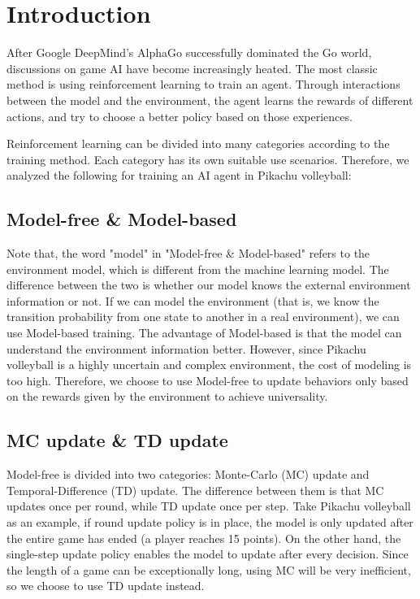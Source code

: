 \documentclass[sigconf]{acmart}
\begin{document}
\section{Introduction}
After Google DeepMind's AlphaGo successfully dominated the Go world, discussions on game AI have become increasingly heated. The most classic method is using reinforcement learning to train an agent. Through interactions between the model and the environment, the agent learns the rewards of different actions, and try to choose a better policy based on those experiences.

Reinforcement learning can be divided into many categories according to the training method. Each category has its own suitable use scenarios. Therefore, we analyzed the following for training an AI agent in Pikachu volleyball:
\subsection{Model-free \& Model-based}
Note that, the word "model" in "Model-free \& Model-based" refers to the environment model, which is different from the machine learning model. The difference between the two is whether our model knows the external environment information or not. If we can model the environment (that is, we know the transition probability from one state to another in a real environment), we can use Model-based training. The advantage of Model-based is that the model can understand the environment information better. However, since Pikachu volleyball is a highly uncertain and complex environment, the cost of modeling is too high. Therefore, we choose to use Model-free to update behaviors only based on the rewards given by the environment to achieve universality.

\subsection{MC update \& TD update}
Model-free is divided into two categories: Monte-Carlo (MC) update and Temporal-Difference (TD) update. The difference between them is that MC updates once per round, while TD update once per step. Take Pikachu volleyball as an example, if round update policy is in place, the model is only updated after the entire game has ended (a player reaches 15 points). On the other hand, the single-step update policy enables the model to update after every decision. Since the length of a game can be exceptionally long, using MC will be very inefficient, so we choose to use TD update instead.
\end{document}
